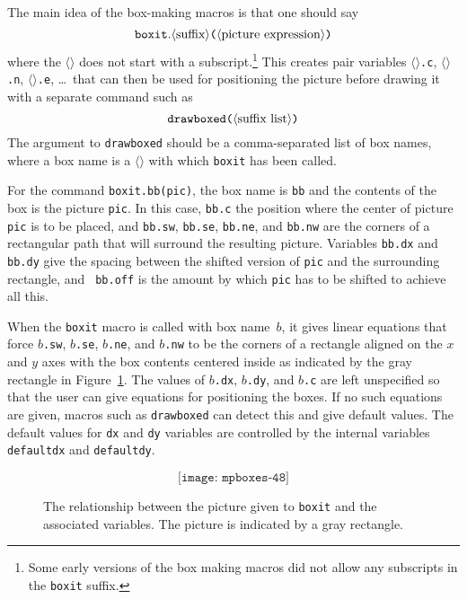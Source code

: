 \documentclass{article} %
\newcommand\descr[1]{{\langle\hbox{\rm#1}\rangle}}
\newcommand\invisgap{\nobreak\hskip0pt\relax}
\newcommand\tdescr[1]{$\langle$\invisgap{\rm#1}\invisgap$\rangle$}
\begin{document}
\mbox{}%
%
%
%
The main idea of the box-making macros is that one should
say\label{Dboxit}
$$ {\tt boxit.} \descr{suffix}
   \hbox{\tt(} \descr{picture expression} \hbox{\tt)}
$$
where the \tdescr{suffix} does not start with a subscript.\footnote{Some early
versions of the box making macros did not allow any subscripts in the
{\tt boxit} suffix.}
This creates pair variables \tdescr{suffix}{\tt.c},
\tdescr{suffix}{\tt.n}, \tdescr{suffix}{\tt.e}, \ldots\ that can then be
used for positioning the picture before drawing it with a separate command such
as\label{Ddrbxed}
$$ \hbox{\tt drawboxed(} \descr{suffix list} \hbox{\tt )} $$
The argument to {\tt drawboxed} should be a comma-separated list of box names,
where a box name is a \tdescr{suffix} with which {\tt boxit}
has been called.

For the command {\tt boxit.bb(pic)}, the box name is {\tt bb} and the
contents of the box is the picture {\tt pic}.  In this case, {\tt bb.c}
the position where the center of picture {\tt pic} is to be placed, and
{\tt bb.sw}, {\tt bb.se}, {\tt bb.ne}, and {\tt bb.nw} are the corners
of a rectangular path that will surround the resulting picture.
Variables {\tt bb.dx} and {\tt bb.dy} give the spacing between the
shifted version of {\tt pic} and the surrounding rectangle, and {\tt
bb.off} is the amount by which {\tt pic} has to be shifted to achieve
all this.

When the {\tt boxit} macro is called with box name~$b$, it gives linear
equations that force $b${\tt.sw}, $b${\tt.se}, $b${\tt.ne}, and
$b${\tt.nw} to be the corners of a rectangle aligned on the $x$ and $y$
axes with the box contents centered inside as indicated by the gray
rectangle in Figure~\ref{fig48}.  The values of $b${\tt.dx},
$b${\tt.dy}, and $b${\tt.c} are left unspecified so that the user can
give equations for positioning the boxes.  If no such equations are
given, macros such as {\tt drawboxed} can detect this and give default
values.  The default values for {\tt dx} and {\tt dy} variables are
controlled by the internal variables {\tt
defaultdx}\label{Ddefaultdx} and
{\tt defaultdy}\label{Ddefaultdy}.%
%

\begin{figure}[htp]
$$ \texttt{[image: mpboxes-48]} $$
\caption[How a {\tt boxit} picture relates to the associated variables]
        {The relationship between the picture given to {\tt boxit} and the
        associated variables.  The picture is indicated by a gray rectangle.}
\label{fig48}
\end{figure}
\end{document}

